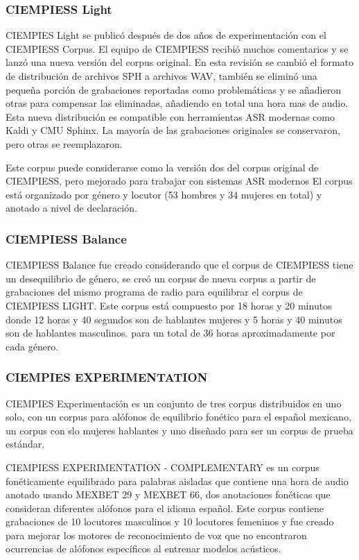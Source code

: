 \subsubsection{CIEMPIESS Light}

CIEMPIES Light \cite{CIEMPIESS-LIGHT} se publicó después de dos años de experimentación con el CIEMPIESS Corpus. El equipo de CIEMPIESS recibió muchos comentarios y se lanzó una nueva versión del corpus original. En esta revisión se cambió el formato de distribución de archivos SPH a archivos WAV, también se eliminó una pequeña porción de grabaciones reportadas como problemáticas y se añadieron otras para compensar las eliminadas, añadiendo en total una hora mas de audio. Esta nueva distribución es compatible con herramientas ASR modernas como Kaldi y CMU Sphinx. La mayoría de las grabaciones originales se conservaron, pero otras se reemplazaron. 

Este corpus puede considerarse como la versión dos del corpus original de CIEMPIESS, pero mejorado para trabajar con sistemas ASR modernos El corpus está organizado por género y locutor (53 hombres y 34 mujeres en total) y anotado a nivel de declaración. 

\subsubsection{CIEMPIESS Balance}

CIEMPIESS Balance \cite{CIEMPIESS-BALANCE} fue creado considerando que el corpus de CIEMPIESS tiene un desequilibrio de género, se creó un corpus de nueva corpus a partir de grabaciones del mismo programa de radio para equilibrar el corpus de CIEMPIESS LIGHT. Este corpus está compuesto por 18 horas y 20 minutos donde 12 horas y 40 segundos son de hablantes mujeres y 5 horas y 40 minutos son de hablantes masculinos. para un total de 36 horas aproximadamente por cada género.


\subsubsection{CIEMPIES EXPERIMENTATION}

CIEMPIES Experimentación \cite{CIEMPIESS-Experimentation} es un conjunto de tres corpus distribuidos en uno solo, con un corpus para alófonos de equilibrio fonético para el español mexicano, un corpus con slo mujeres hablantes y uno diseñado para ser un corpus de prueba estándar.

CIEMPIESS EXPERIMENTATION - COMPLEMENTARY es un corpus fonéticamente equilibrado para palabras aisladas que contiene una hora de audio anotado usando MEXBET 29 y MEXBET 66, dos anotaciones fonéticas que consideran diferentes alófonos para el idioma español. Este corpus contiene grabaciones de 10 locutores masculinos y 10 locutores femeninos y fue creado para mejorar los motores de reconocimiento de voz que no encontraron ocurrencias de alófonos específicos al entrenar modelos acústicos.

